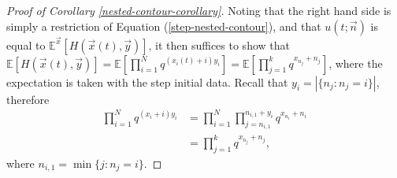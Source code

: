 \begin{proof}[Proof of Corollary \ref{nested-contour-corollary}]
Noting that the right hand side is simply a restriction of Equation (\ref{step-nested-contour}), and that $u(t;\vec{n})$ is equal to $\mathbb{E}^{\vec{x}}[H(\vec{x}(t), \vec{y})]$, it then suffices to show that $\mathbb{E}[H(\vec{x}(t), \vec{y})] =\mathbb{E} \left[ \prod_{i=1}^N q^{(x_i(t) + i) y_i} \right]= \mathbb{E} \left[ \prod_{j=1}^k q^{x_{n_j}+n_j} \right]$, where the expectation is taken with the step initial data. Recall that $y_i = |\{n_j: n_j = i\}|$, therefore
\begin{align*}
\prod_{i=1}^N q^{(x_i + i) y_i} &= \prod_{i=1}^{N} \prod_{j=n_{i,1}}^{n_{i,1}+y_i} q^{x_{n_i} + n_i}\\
																&= \prod_{j=1}^k q^{x_{n_j}+n_j},
\end{align*}
where $n_{i,1} = \min \{j : n_j = i\}$.
\end{proof}

